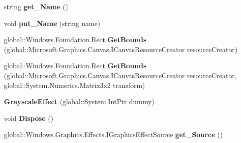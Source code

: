 \begin{DoxyCompactItemize}
\item 
\mbox{\label{class_microsoft_1_1_graphics_1_1_canvas_1_1_effects_1_1_grayscale_effect_a117ed36d181db744afe54ab71b696015}} 
string {\bfseries get\+\_\+\+Name} ()
\item 
\mbox{\label{class_microsoft_1_1_graphics_1_1_canvas_1_1_effects_1_1_grayscale_effect_a6f0da33fc5a20068a080efaf0d6a77a0}} 
void {\bfseries put\+\_\+\+Name} (string name)
\item 
\mbox{\label{class_microsoft_1_1_graphics_1_1_canvas_1_1_effects_1_1_grayscale_effect_ac52042872c6556a310cff19bb7c4040f}} 
global\+::\+Windows.\+Foundation.\+Rect {\bfseries Get\+Bounds} (global\+::\+Microsoft.\+Graphics.\+Canvas.\+I\+Canvas\+Resource\+Creator resource\+Creator)
\item 
\mbox{\label{class_microsoft_1_1_graphics_1_1_canvas_1_1_effects_1_1_grayscale_effect_a1d303822b3c4206b73165e84e42e55cd}} 
global\+::\+Windows.\+Foundation.\+Rect {\bfseries Get\+Bounds} (global\+::\+Microsoft.\+Graphics.\+Canvas.\+I\+Canvas\+Resource\+Creator resource\+Creator, global\+::\+System.\+Numerics.\+Matrix3x2 transform)
\item 
\mbox{\label{class_microsoft_1_1_graphics_1_1_canvas_1_1_effects_1_1_grayscale_effect_a015472d5b20c0e171a411c27f64edc01}} 
{\bfseries Grayscale\+Effect} (global\+::\+System.\+Int\+Ptr dummy)
\item 
\mbox{\label{class_microsoft_1_1_graphics_1_1_canvas_1_1_effects_1_1_grayscale_effect_a7372dc109bbbb885617e2d79209b7c87}} 
void {\bfseries Dispose} ()
\item 
\mbox{\label{class_microsoft_1_1_graphics_1_1_canvas_1_1_effects_1_1_grayscale_effect_a2e2ee157a9b4c692f2f71f46fd3aa570}} 
global\+::\+Windows.\+Graphics.\+Effects.\+I\+Graphics\+Effect\+Source {\bfseries get\+\_\+\+Source} ()

\end{DoxyCompactItemize}
